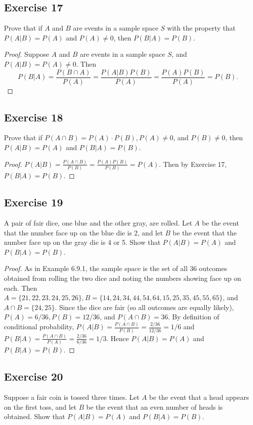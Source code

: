 \documentclass[14pt]{extarticle}
\begin{document}
\subsection{Exercise 17}
Prove that if \(A\) and \(B\) are events in a sample space \(S\) with the property that \(P(A|B) = P(A)\) and 
\(P(A) \neq 0\), then \(P(B|A) = P(B)\).

\begin{proof}
Suppose \(A\) and \(B\) are events in a sample space \(S\), and \(P(A|B) = P(A) \neq 0\). Then
\[
P(B|A) = \frac{P(B\cap A)}{P(A)} = \frac{P(A|B)P(B)}{P(A)} = \frac{P(A)P(B)}{P(A)} = P(B).
\]
\end{proof}

\subsection{Exercise 18}
Prove that if \(P(A \cap B) = P(A) \cdot P(B), P(A) \neq 0\), and \(P(B) \neq 0\), then \(P(A|B) = P(A)\) and 
\(P(B|A) = P(B)\).

\begin{proof}
\(P(A|B) = \frac{P(A \cap B)}{P(B)} = \frac{P(A)P(B)}{P(B)} = P(A)\). Then by Exercise 17, \(P(B|A) = P(B)\).
\end{proof}

\subsection{Exercise 19}
A pair of fair dice, one blue and the other gray, are rolled. Let \(A\) be the event that the number face up on the blue die 
is 2, and let \(B\) be the event that the number face up on the gray die is 4 or 5. Show that \(P(A|B) = P(A)\) and 
\(P(B|A) = P(B)\).

\begin{proof}
As in Example 6.9.1, the sample space is the set of all 36 outcomes obtained from rolling the two dice and noting the 
numbers showing face up on each. Then \(A = \{21, 22, 23, 24, 25, 26\}, B = \{14, 24, 34, 44, 54, 64, 15, 25, 35, 45, 55, 
65\}\), and \(A \cap B = \{24, 25\}\). Since the dice are fair (so all outcomes are equally likely), \(P(A) = 6/36, P(B) = 
12/36\), and \(P(A \cap B) = 36\). By definition of conditional probability, \(P(A|B) = \frac{P(A \cap B)}{P(B)} = 
\frac{2/36}{12/36} = 1/6\) and \(P(B|A) = \frac{P(A \cap B)}{P(A)} = \frac{2/36}{6/36} = 1/3\). Hence \(P(A|B) = P(A)\) 
and \(P(B|A) = P(B)\).
\end{proof}

\subsection{Exercise 20}
Suppose a fair coin is tossed three times. Let \(A\) be the event that a head appears on the first toss, and let \(B\) be 
the event that an even number of heads is obtained. Show that \(P(A|B) = P(A)\) and \(P(B|A) = P(B)\).
\end{document}
